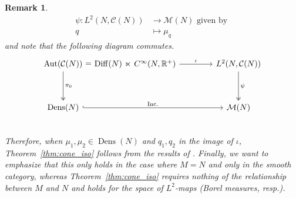 \documentclass[final,hidelinks,onefignum,onetabnum]{siamart220329}
\newtheorem{remark}{Remark}
\newcommand{\R}{\mathbb{R}}
\begin{document}
{\begin{remark}
\begin{align*}
    \psi:L^2(N,\mathcal{C}(N))&\to \mathcal{M}(N)\text{ given by }\\
    q&\mapsto \mu_q
\end{align*}
and note that the following diagram commutes.
\begin{equation*}
\begin{tikzcd}[column sep=tiny,ampersand replacement=\&]
      \operatorname{Aut}(\mathcal{C}(N))\arrow[two heads]{dd}{\pi_0}\arrow[r,phantom,"=" description]\& \operatorname{Diff}(N)\arrow[r,phantom,"\ltimes" description]\& C^{\infty}(N,\R^+) \arrow[rightarrow]{rr}{\iota}\&\qquad\&L^2(N,\mathcal{C}(N))\arrow[two heads]{dd}{\psi} \\
      \\
      \operatorname{Dens}(N) \arrow[hookrightarrow]{rrrr}{\text{Inc.}}\&\&\&\& \mathcal{M}(N)\\
\end{tikzcd}
\end{equation*}
Therefore, when $\mu_1,\mu_2\in \operatorname{Dens}(N)$ and $q_1, q_2$  in the image of $\iota$, Theorem~\ref{thm:cone_iso} follows from the results of \cite{GALLOUET20184199}. Finally, we want to emphasize that this only holds in the case where $M=N$ and only in the smooth category, whereas Theorem~\ref{thm:cone_iso} requires nothing of the relationship between $M$ and $N$ and holds for the space of $L^2$-maps (Borel measures, resp.). 
\end{remark}}
\end{document}
